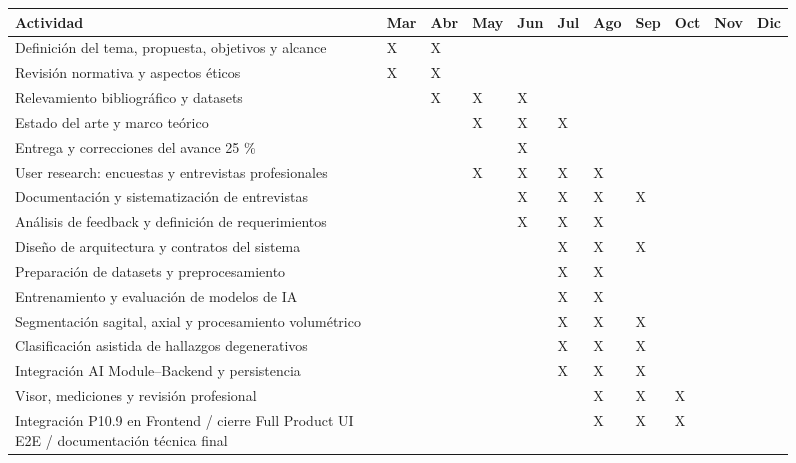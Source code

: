\begin{figure}[H]
\centering
\scriptsize
\setlength{\tabcolsep}{2pt}
\renewcommand{\arraystretch}{1.08}
\begin{adjustbox}{max width=\textwidth}
\begin{tabular}{|>{\raggedright\arraybackslash}p{}|*{10}{>{\centering\arraybackslash}p{}|}}
\hline
\textbf{Actividad} & \textbf{Mar} & \textbf{Abr} & \textbf{May} & \textbf{Jun} & \textbf{Jul} & \textbf{Ago} & \textbf{Sep} & \textbf{Oct} & \textbf{Nov} & \textbf{Dic} \\
\hline
Definición del tema, propuesta, objetivos y alcance & X & X &  &  &  &  &  &  &  &  \\
\hline
Revisión normativa y aspectos éticos & X & X &  &  &  &  &  &  &  &  \\
\hline
Relevamiento bibliográfico y datasets &  & X & X & X &  &  &  &  &  &  \\
\hline
Estado del arte y marco teórico &  &  & X & X & X &  &  &  &  &  \\
\hline
Entrega y correcciones del avance 25 \% &  &  &  & X &  &  &  &  &  &  \\
\hline
User research: encuestas y entrevistas profesionales &  &  & X & X & X & X &  &  &  &  \\
Documentación y sistematización de entrevistas &  &  &  & X & X & X & X &  &  &  \\
\hline
Análisis de feedback y definición de requerimientos &  &  &  & X & X & X &  &  &  &  \\
\hline
Diseño de arquitectura y contratos del sistema &  &  &  &  & X & X & X &  &  &  \\
\hline
Preparación de datasets y preprocesamiento &  &  &  &  & X & X &  &  &  &  \\
\hline
Entrenamiento y evaluación de modelos de IA &  &  &  &  & X & X &  &  &  &  \\
\hline
Segmentación sagital, axial y procesamiento volumétrico &  &  &  &  & X & X & X &  &  &  \\
\hline
Clasificación asistida de hallazgos degenerativos &  &  &  &  & X & X & X &  &  &  \\
\hline
Integración AI Module–Backend y persistencia &  &  &  &  & X & X & X &  &  &  \\
\hline
Visor, mediciones y revisión profesional &  &  &  &  &  & X & X & X &  &  \\
\hline
Integración P10.9 en Frontend / cierre Full Product UI E2E / documentación técnica final &  &  &  &  &  & X & X & X &  &  \\

\end{tabular}
\end{adjustbox}
\end{figure}
